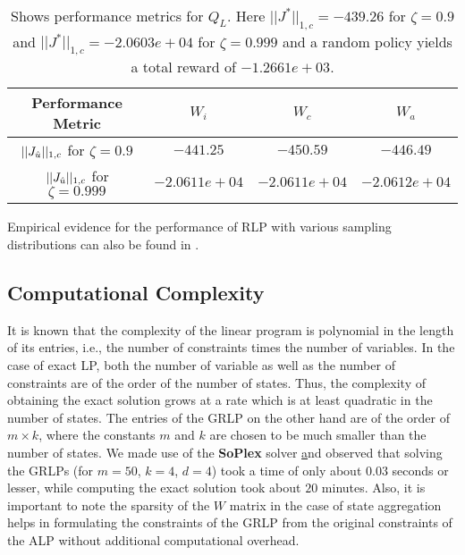 \FloatBarrier
\begin{table}[H]
\begin{center}
\begin{tabular}{|c|c|c|c|}\hline
Performance Metric&	$W_i$&	$W_c$& $W_a$ \\\hline
$||J_{\hat{u}}||_{1,c}$ for $\zeta=0.9$& $-441.25$&	$-450.59$& $-446.49$ \\\hline
$||J_{\hat{u}}||_{1,c}$ for $\zeta=0.999$& $-2.0611e+04$&	$-2.0611e+04$& $-2.0612e+04$ \\\hline
\end{tabular}
\end{center}
\caption{Shows performance metrics for $Q_L$. Here $||J^*||_{1,c}=-439.26$ for $\zeta=0.9$ and $||J^*||_{1,c}=-2.0603e+04$ for $\zeta=0.999$   and a random policy yields a total reward of $-1.2661e+03
$.}
\label{pref}
\end{table}
Empirical evidence for the performance of RLP with various sampling distributions can also be found in \cite{CST,CS}.
\subsection{Computational Complexity}
It is known that the complexity of the linear program \cite{karmarkar} is polynomial in the length of its entries, i.e., the number of constraints times the number of variables. In the case of exact LP, both the number of variable as well as the number of constraints are of the order of the number of states. Thus, the complexity of obtaining the exact solution grows at a rate which is at least quadratic in the number of states. The entries of the GRLP on the other hand are of the order of $m\times k$,  where the constants $m$ and $k$ are chosen to be much smaller than the number of states. We made use of the \textbf{SoPlex} solver \href{http://soplex.zib.de/} and observed that solving the GRLPs (for $m=50$, $k=4$, $d=4$) took a time of only about $0.03$ seconds or lesser, while computing the exact solution took about $20$ minutes.
 Also, it is important to note the sparsity of the $W$ matrix in the case of state aggregation helps in formulating the constraints of the GRLP from the original constraints of the ALP without additional computational overhead.
